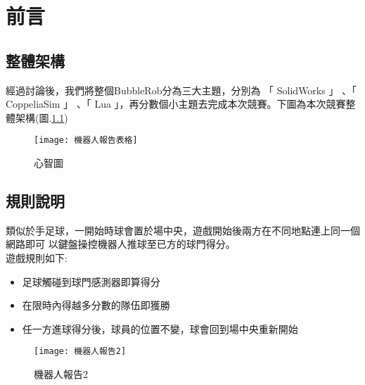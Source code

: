 \chapter{前言}
\renewcommand{\baselinestretch}{10.0} %
\setcounter{page}{1}  %
\fontsize{14pt}{2.5pt}\sectionef
\section{整體架構}
    經過討論後，我們將整個BubbleRob分為三大主題，分別為 「 SolidWorks 」 、「 CoppeliaSim 」 、「 Lua 」，再分數個小主題去完成本次競賽。下圖為本次競賽整體架構(圖.\ref{fig.機器人報告表格})\\

\begin{figure}[hbt!]
\begin{center}
\texttt{[image: 機器人報告表格]}
\caption{\Large 心智圖}\label{fig.機器人報告表格}
\end{center}
\end{figure}


\section{規則說明}
類似於手足球，一開始時球會置於場中央，遊戲開始後兩方在不同地點連上同一個網路即可
以鍵盤操控機器人推球至已方的球門得分。\\
 
遊戲規則如下:\\

\begin{itemize}
	\item 足球觸碰到球門感測器即算得分\\
	\item 在限時內得越多分數的隊伍即獲勝\\
	\item 任一方進球得分後，球員的位置不變，球會回到場中央重新開始\\
\end{itemize}
\begin{figure}[hbt!]
\begin{center}
\texttt{[image: 機器人報告2]}
\caption{\Large 機器人報告2 }
\label{機器人報告2 }
\end{center}
\end{figure}

\renewcommand{\baselinestretch}{0.5} %
